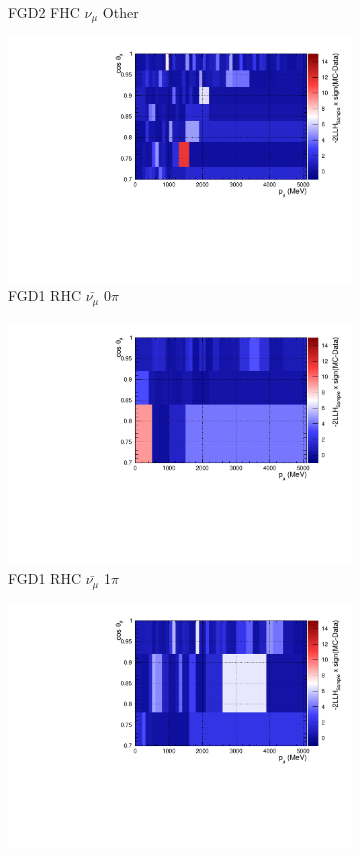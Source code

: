\begin{figure}[!htbp]
\begin{subfigure}{.32\textwidth}
  \caption{FGD2 FHC $\nu_{\mu}$ Other}
  \label{fig:llhcont_FGD2_numuCC_other}
\end{subfigure}
\centering
\begin{subfigure}{.32\textwidth}
  \centering
  \includegraphics[width=0.85\linewidth]{figs/llhcont_Poly574_FGD1_anti-numuCC_0pi.pdf}
  \caption{FGD1 RHC $\bar{\nu_{\mu}}$ 0$\pi$}
  \label{fig:llhcont_FGD1_anti-numuCC_0pi}
\end{subfigure}
\begin{subfigure}{.32\textwidth}
  \centering
  \includegraphics[width=0.85\linewidth]{figs/llhcont_Poly574_FGD1_anti-numuCC_1pi.pdf}
  \caption{FGD1 RHC $\bar{\nu_{\mu}}$ 1$\pi$}
  \label{fig:llhcont_FGD1_anti-numuCC_1pi}
\end{subfigure}
\begin{subfigure}{.32\textwidth}
  \centering
  \includegraphics[width=0.85\linewidth]{figs/llhcont_Poly574_FGD1_anti-numuCC_other.pdf}

\end{subfigure}
\end{figure}
